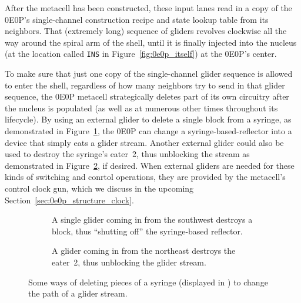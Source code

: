 After the metacell has been constructed, these input lanes read in a copy of the 0E0P's single-channel construction recipe and state lookup table from its neighbors. That (extremely long) sequence of gliders revolves clockwise all the way around the spiral arm of the shell, until it is finally injected into the nucleus (at the location called \texttt{INS} in Figure~\ref{fig:0e0p_itself}) at the 0E0P's center.

To make sure that just one copy of the single-channel glider sequence is allowed to enter the shell, regardless of how many neighbors try to send in that glider sequence, the 0E0P metacell strategically deletes part of its own circuitry after the nucleus is populated (as well as at numerous other times throughout its lifecycle). By using an external glider to delete a single block from a syringe, as demonstrated in Figure~\ref{fig:syringe_delete_block}, the 0E0P can change a syringe-based-reflector into a device that simply eats a glider stream. Another external glider could also be used to destroy the syringe's eater~2, thus unblocking the stream as demonstrated in Figure~\ref{fig:syringe_delete_eater}, if desired. When external gliders are needed for these kinds of switching and conrtol operations, they are provided by the metacell's control clock gun, which we discuss in the upcoming Section~\ref{sec:0e0p_structure_clock}.

\begin{figure}[!htb]
	\centering
	\begin{subfigure}{.535\textwidth}
		\centering
		\caption{A single glider coming in from the southwest destroys a block, thus ``shutting off'' the syringe-based reflector.}
		\label{fig:syringe_delete_block}
	\end{subfigure} \hfill \begin{subfigure}{.435\textwidth}
		\centering
		\caption{A glider coming in from the northeast destroys the eater~2, thus unblocking the glider stream.}
		\label{fig:syringe_delete_eater}
	\end{subfigure}
	\caption{Some ways of deleting pieces of a syringe (displayed in ) to change the path of a glider stream.}\label{fig:syringe_path_changer}
\end{figure}



